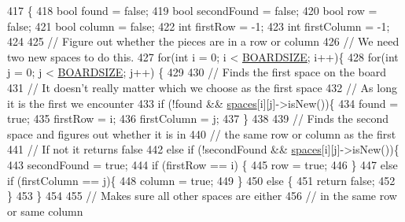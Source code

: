 \begin{DoxyCode}
417 \{
418     \textcolor{keywordtype}{bool} found = \textcolor{keyword}{false};
419     \textcolor{keywordtype}{bool} secondFound = \textcolor{keyword}{false};
420     \textcolor{keywordtype}{bool} row = \textcolor{keyword}{false};
421     \textcolor{keywordtype}{bool} column = \textcolor{keyword}{false};
422     \textcolor{keywordtype}{int} firstRow = -1;
423     \textcolor{keywordtype}{int} firstColumn = -1;
424 
425     \textcolor{comment}{// Figure out whether the pieces are in a row or column}
426     \textcolor{comment}{// We need two new spaces to do this.}
427     \textcolor{keywordflow}{for}(\textcolor{keywordtype}{int} i = 0; i < \hyperlink{board_8h_afb909c1a2193edc88c68390c025b2fa7}{BOARDSIZE}; i++)\{
428         \textcolor{keywordflow}{for}(\textcolor{keywordtype}{int} j = 0; j < \hyperlink{board_8h_afb909c1a2193edc88c68390c025b2fa7}{BOARDSIZE}; j++) \{
429 
430             \textcolor{comment}{// Finds the first space on the board}
431             \textcolor{comment}{// It doesn't really matter which we choose as the first space}
432             \textcolor{comment}{// As long it is the first we encounter}
433             \textcolor{keywordflow}{if} (!found && \hyperlink{class_board_a73b12248ddb6ee3adc24f4458d8661c2}{spaces}[i][j]->isNew())\{
434                 found = \textcolor{keyword}{true};
435                 firstRow = i;
436                 firstColumn = j;
437             \}
438 
439             \textcolor{comment}{// Finds the second space and figures out whether it is in}
440             \textcolor{comment}{// the same row or column as the first}
441             \textcolor{comment}{// If not it returns false}
442             \textcolor{keywordflow}{else} \textcolor{keywordflow}{if} (!secondFound && \hyperlink{class_board_a73b12248ddb6ee3adc24f4458d8661c2}{spaces}[i][j]->isNew())\{
443                 secondFound = \textcolor{keyword}{true};
444                 \textcolor{keywordflow}{if} (firstRow == i) \{
445                     row = \textcolor{keyword}{true};
446                 \}
447                 \textcolor{keywordflow}{else} \textcolor{keywordflow}{if} (firstColumn == j)\{
448                     column = \textcolor{keyword}{true};
449                 \}
450                 \textcolor{keywordflow}{else} \{
451                     \textcolor{keywordflow}{return} \textcolor{keyword}{false};
452                 \}
453             \}
454 
455             \textcolor{comment}{// Makes sure all other spaces are either}
456             \textcolor{comment}{// in the same row or same column}

\end{DoxyCode}
